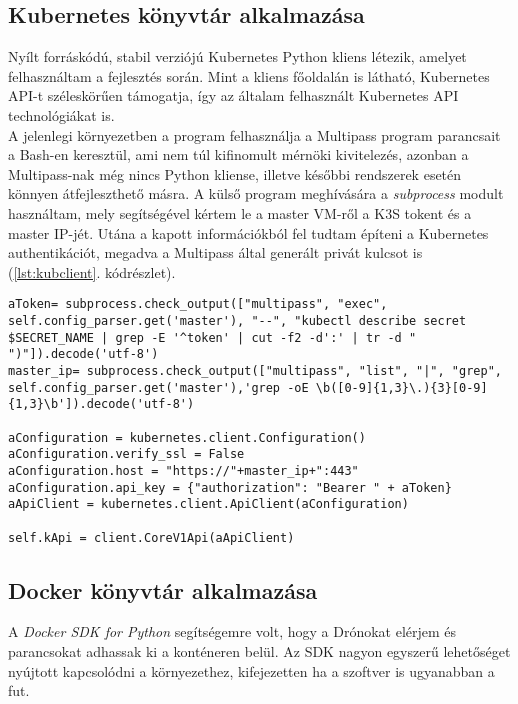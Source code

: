 \subsection{Kubernetes könyvtár alkalmazása}
Nyílt forráskódú, stabil verziójú Kubernetes Python kliens létezik, amelyet felhasználtam a fejlesztés során. \cite{kubpy} Mint a kliens főoldalán is látható, Kubernetes API-t széleskörűen támogatja, így az általam felhasznált Kubernetes API technológiákat is. \\

\noindent
A jelenlegi környezetben a program felhasználja a Multipass program parancsait a Bash-en keresztül, ami nem túl kifinomult mérnöki kivitelezés, azonban a Multipass-nak még nincs Python kliense, illetve későbbi rendszerek esetén könnyen átfejleszthető másra. A külső program meghívására a \emph{subprocess} modult használtam, mely segítségével kértem le a master VM-ről a K3S tokent és a master IP-jét. Utána a kapott információkból fel tudtam építeni a Kubernetes authentikációt, megadva a Multipass által generált privát kulcsot is (\ref{lst:kubclient}. kódrészlet).

\begin{lstlisting}[caption={Kubernetes kliens felépítése}, label={lst:kubclient}]
aToken= subprocess.check_output(["multipass", "exec", self.config_parser.get('master'), "--", "kubectl describe secret $SECRET_NAME | grep -E '^token' | cut -f2 -d':' | tr -d " ")"]).decode('utf-8')
master_ip= subprocess.check_output(["multipass", "list", "|", "grep", self.config_parser.get('master'),'grep -oE \b([0-9]{1,3}\.){3}[0-9]{1,3}\b']).decode('utf-8')

aConfiguration = kubernetes.client.Configuration()
aConfiguration.verify_ssl = False
aConfiguration.host = "https://"+master_ip+":443"
aConfiguration.api_key = {"authorization": "Bearer " + aToken}
aApiClient = kubernetes.client.ApiClient(aConfiguration)

self.kApi = client.CoreV1Api(aApiClient)
\end{lstlisting}

\subsection{Docker könyvtár alkalmazása}
A \emph{Docker SDK for Python} segítségemre volt, hogy a Drónokat elérjem és parancsokat adhassak ki a konténeren belül. Az SDK nagyon egyszerű lehetőséget nyújtott kapcsolódni a környezethez, kifejezetten ha a szoftver is ugyanabban a fut. \\

